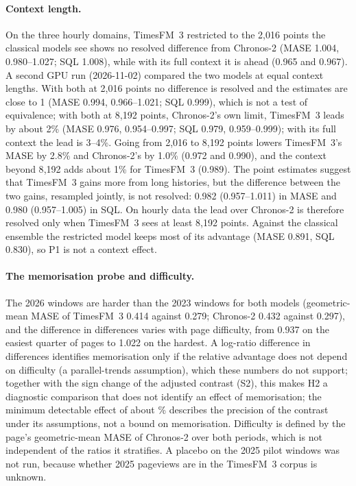 \paragraph{Context length.} On the three hourly domains, TimesFM~3 restricted to the 2{,}016 points the classical models see shows no
resolved difference from Chronos-2 (MASE 1.004, 0.980--1.027; SQL 1.008), while with its full context it is ahead (0.965 and 0.967).
A second GPU run (2026-11-02) compared the two models at equal context lengths. With both at 2{,}016 points no difference is resolved
and the estimates are close to 1 (MASE 0.994, 0.966--1.021; SQL 0.999), which is not a test of equivalence; with both at 8{,}192
points, Chronos-2's own limit, TimesFM~3 leads by about 2\% (MASE 0.976, 0.954--0.997; SQL 0.979, 0.959--0.999); with its full
context the lead is 3--4\%. Going from 2{,}016 to 8{,}192 points lowers TimesFM~3's MASE by 2.8\% and Chronos-2's by 1.0\% (0.972
and 0.990), and the context beyond 8{,}192 adds about 1\% for TimesFM~3 (0.989). The point estimates suggest that TimesFM~3 gains
more from long histories, but the difference between the two gains, resampled jointly, is not resolved: 0.982 (0.957--1.011) in MASE
and 0.980 (0.957--1.005) in SQL. On hourly data the lead over Chronos-2 is therefore resolved only when TimesFM~3 sees at least
8{,}192 points. Against the classical ensemble the restricted
model keeps most of its advantage (MASE 0.891, SQL 0.830), so P1 is not a context effect.

\paragraph{The memorisation probe and difficulty.} The 2026 windows are harder than the 2023 windows for both models
(geometric-mean MASE of TimesFM~3 0.414 against 0.279; Chronos-2 0.432 against 0.297), and the difference in differences varies
with page difficulty, from 0.937 on the easiest quarter of pages to 1.022 on the hardest. A log-ratio difference in differences
identifies memorisation only if the relative advantage does not depend on difficulty (a parallel-trends assumption), which these
numbers do not support; together with the sign change of the adjusted contrast (S2), this makes H2 a diagnostic comparison that
does not identify an effect of memorisation; the minimum detectable effect of about \HtwoMde\% describes the precision of the contrast
under its assumptions, not a bound on memorisation. Difficulty is defined by the page's geometric-mean MASE of Chronos-2 over both
periods, which is not independent of the ratios it stratifies. A placebo on the 2025 pilot windows was not run, because whether 2025 pageviews are in the TimesFM~3 corpus is unknown.

